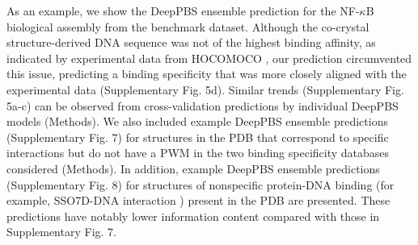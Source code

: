 \par
As an example, we show the DeepPBS ensemble prediction for the NF-$\kappa$B biological assembly from the benchmark dataset. Although the co-crystal structure-derived DNA sequence was not of the highest binding affinity, as indicated by experimental data from HOCOMOCO \citep{kulakovskiy2018hocomoco}, our prediction circumvented this issue, predicting a binding specificity that was more closely aligned with the experimental data (Supplementary Fig. 5d). Similar trends (Supplementary Fig. 5a-c) can be observed from cross-validation predictions by individual DeepPBS models (Methods). We also included example DeepPBS ensemble predictions (Supplementary Fig. 7) for structures in the PDB that correspond to specific interactions but do not have a PWM in the two binding specificity databases considered (Methods). In addition, example DeepPBS ensemble predictions (Supplementary Fig. 8) for structures of nonspecific protein-DNA binding (for example, SSO7D-DNA interaction \citep{Agback1998}) present in the PDB are presented. These predictions have notably lower information content compared with those in Supplementary Fig. 7.

